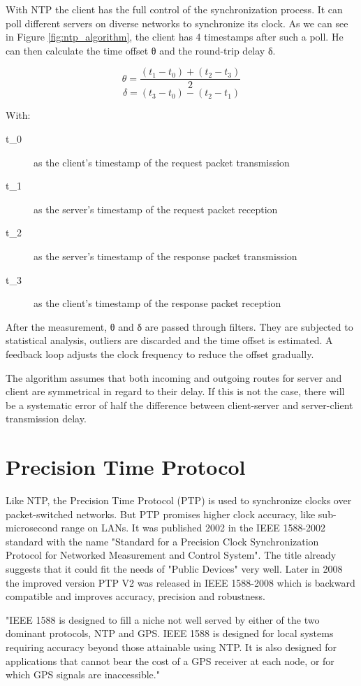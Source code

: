 With NTP the client has the full control of the synchronization process. It can poll different servers on diverse networks to synchronize its clock. As we can see in Figure \ref{fig:ntp_algorithm}, the client has 4 timestamps after such a poll. He can then calculate the time offset θ and the round-trip delay δ.

\[ \theta = \frac{(t_1 - t_0) + (t_2 - t_3)}{2} \]
\[ \delta = (t_3 - t_0) - (t_2 - t_1) \]

With:
\begin{description}
    \item[t_0] as the client's timestamp of the request packet transmission
    \item[t_1] as the server's timestamp of the request packet reception
    \item[t_2] as the server's timestamp of the response packet transmission
    \item[t_3] as the client's timestamp of the response packet reception
\end{description}

After the measurement, θ and δ are passed through filters. They are subjected to statistical analysis, outliers are discarded and the time offset is estimated. A feedback loop adjusts the clock frequency to reduce the offset gradually.

The algorithm assumes that both incoming and outgoing routes for server and client are symmetrical in regard to their delay. If this is not the case, there will be a systematic error of half the difference between client-server and server-client transmission delay.

\section{Precision Time Protocol}

Like NTP, the Precision Time Protocol (PTP) is used to synchronize clocks over packet-switched networks. But PTP promises higher clock accuracy, like sub-microsecond range on LANs. It was published 2002 in the IEEE 1588-2002 standard with the name "Standard for a Precision Clock Synchronization Protocol for Networked Measurement and Control System". The title already suggests that it could fit the needs of "Public Devices" very well. Later in 2008 the improved version PTP V2 was released in IEEE 1588-2008 which is backward compatible and improves accuracy, precision and robustness.

"IEEE 1588 is designed to fill a niche not well served by either of the two dominant protocols, NTP and GPS. IEEE 1588 is designed for local systems requiring accuracy beyond those attainable using NTP. It is also designed for applications that cannot bear the cost of a GPS receiver at each node, or for which GPS signals are inaccessible."

